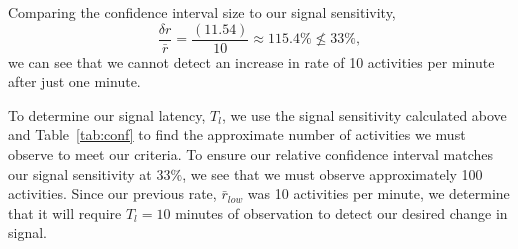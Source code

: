 \documentclass{article}
\begin{document}
Comparing the confidence interval size to our signal sensitivity,
\begin{equation}
    \label{eq:ex2:notmet}
    \frac{\delta r}{\bar{r}} = \frac{(11.54)}{10} \approx 115.4\% \not\le 33\%, 
\end{equation}
we can see that we cannot detect an increase in rate of 10 activities per minute after just one 
minute.

To determine our signal latency, $T_l$, we use the signal sensitivity calculated above and 
Table~\ref{tab:conf} to find the approximate number of activities we must observe to meet our 
criteria. To ensure our relative confidence interval matches our signal sensitivity at $33\%$, we 
see that we must observe approximately 100 activities. Since our previous rate, $\bar{r}_{low}$ 
was 10 activities per minute, we determine that it will require $T_l = 10$ minutes of 
observation to detect our desired change in signal.
\end{document}
